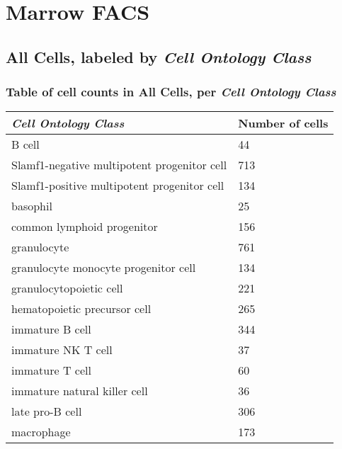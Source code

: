 \clearpage
\section{Marrow FACS}

\subsection{All Cells, labeled by \emph{Cell Ontology Class}}
\subsubsection{Table of cell counts in All Cells, per \emph{Cell Ontology Class}}\begin{table}[h]
\centering
\label{my-label}
\begin{tabular}{@{}ll@{}}
\toprule

\emph{Cell Ontology Class}& Number of cells \\ \midrule
B cell & 44 \\

Slamf1-negative multipotent progenitor cell & 713 \\

Slamf1-positive multipotent progenitor cell & 134 \\

basophil & 25 \\

common lymphoid progenitor & 156 \\

granulocyte & 761 \\

granulocyte monocyte progenitor cell & 134 \\

granulocytopoietic cell & 221 \\

hematopoietic precursor cell & 265 \\

immature B cell & 344 \\

immature NK T cell & 37 \\

immature T cell & 60 \\

immature natural killer cell & 36 \\

late pro-B cell & 306 \\

macrophage & 173 \\


\end{tabular}
\end{table}

